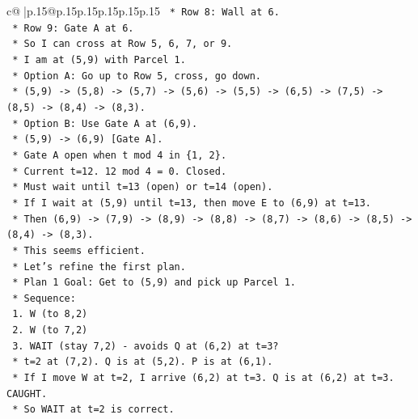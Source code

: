 \documentclass{article}
\begin{document}
{\begin{supertabular}{c@{$\;$}|p{.15\linewidth}@{}p{.15\linewidth}p{.15\linewidth}p{.15\linewidth}p{.15\linewidth}p{.15\linewidth}}
{{{\texttt{                *   Row 8: Wall at 6.} \\
\texttt{                *   Row 9: Gate A at 6.} \\
\texttt{                *   So I can cross at Row 5, 6, 7, or 9.} \\
\texttt{                *   I am at (5,9) with Parcel 1.} \\
\texttt{                *   Option A: Go up to Row 5, cross, go down.} \\
\texttt{                    *   (5,9) {-}> (5,8) {-}> (5,7) {-}> (5,6) {-}> (5,5) {-}> (6,5) {-}> (7,5) {-}> (8,5) {-}> (8,4) {-}> (8,3).} \\
\texttt{                *   Option B: Use Gate A at (6,9).} \\
\texttt{                    *   (5,9) {-}> (6,9) {[}Gate A{]}.} \\
\texttt{                    *   Gate A open when t mod 4 in \{1, 2\}.} \\
\texttt{                    *   Current t=12. 12 mod 4 = 0. Closed.} \\
\texttt{                    *   Must wait until t=13 (open) or t=14 (open).} \\
\texttt{                    *   If I wait at (5,9) until t=13, then move E to (6,9) at t=13.} \\
\texttt{                    *   Then (6,9) {-}> (7,9) {-}> (8,9) {-}> (8,8) {-}> (8,7) {-}> (8,6) {-}> (8,5) {-}> (8,4) {-}> (8,3).} \\
\texttt{                    *   This seems efficient.} \\
\texttt{            *   Let's refine the first plan.} \\
\texttt{            *   Plan 1 Goal: Get to (5,9) and pick up Parcel 1.} \\
\texttt{            *   Sequence:} \\
\texttt{                1.  W (to 8,2)} \\
\texttt{                2.  W (to 7,2)} \\
\texttt{                3.  WAIT (stay 7,2) {-} avoids Q at (6,2) at t=3?} \\
\texttt{                    *   t=2 at (7,2). Q is at (5,2). P is at (6,1).} \\
\texttt{                    *   If I move W at t=2, I arrive (6,2) at t=3. Q is at (6,2) at t=3. CAUGHT.} \\
\texttt{                    *   So WAIT at t=2 is correct.} \\
}}}
\end{supertabular}}
\end{document}
